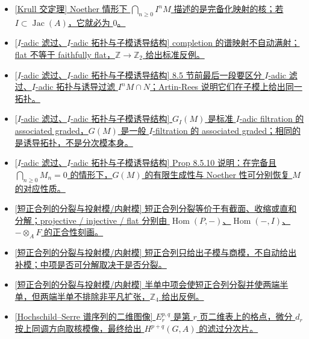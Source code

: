 \documentclass[a4paper]{ctexart}
\theoremstyle{definition}
\theoremstyle{analysis}
\theoremstyle{plain}
\begin{document}
\begin{itemize}
  \item \hyperref[rem:krull-intersection]{[\hyperref[subsec:krull-intersection]{Krull 交定理}] Noether 情形下 \(\bigcap_{n\ge 0} I^nM\) 描述的是完备化映射的核；若 \(I\subset \operatorname{Jac}(A)\)，它就必为 \(0\)。}
  \item \hyperref[rem:completion-spec-not-surjective]{[\hyperref[subsec:iadic-subspace-topology]{\(I\)-adic 滤过、\(I\)-adic 拓扑与子模诱导结构}] completion 的谱映射不自动满射；flat 不等于 faithfully flat，\(\mathbb Z\to \mathbb Z_2\) 给出标准反例。}
  \item \hyperref[rem:artin-rees-subspace-topology]{[\hyperref[subsec:iadic-subspace-topology]{\(I\)-adic 滤过、\(I\)-adic 拓扑与子模诱导结构}] 8.5 节前最后一段要区分 \(I\)-adic 滤过、\(I\)-adic 拓扑与诱导过滤 \(I^nM\cap N\)；Artin-Rees 说明它们在子模上给出同一拓扑。}
  \item \hyperref[rem:giM-vs-gM]{[\hyperref[subsec:iadic-subspace-topology]{\(I\)-adic 滤过、\(I\)-adic 拓扑与子模诱导结构}] \(G_I(M)\) 是标准 \(I\)-adic filtration 的 associated graded，\(G(M)\) 是一般 \(I\)-filtration 的 associated graded；相同的是诱导拓扑，不是分次模本身。}
  \item \hyperref[rem:prop8510-graded-recovery]{[\hyperref[subsec:iadic-subspace-topology]{\(I\)-adic 滤过、\(I\)-adic 拓扑与子模诱导结构}] Prop 8.5.10 说明：在完备且 \(\bigcap_{n\ge 0}M_n=0\) 的情形下，\(G(M)\) 的有限生成性与 Noether 性可分别恢复 \(M\) 的对应性质。}
  \item \hyperref[rem:split-projective-injective]{[\hyperref[subsec:split-projective-injective]{短正合列的分裂与投射模/内射模}] 短正合列分裂等价于有截面、收缩或直和分解；projective / injective / flat 分别由 \(\operatorname{Hom}(P,-)\)、\(\operatorname{Hom}(-,I)\)、\(-\otimes_A F\) 的正合性刻画。}
  \item \hyperref[rem:short-exact-nonsplit-reducible]{[\hyperref[subsec:split-projective-injective]{短正合列的分裂与投射模/内射模}] 短正合列只给出子模与商模，不自动给出补模；中项是否可分解取决于是否分裂。}
  \item \hyperref[rem:semisimple-short-exact-sequence]{[\hyperref[subsec:split-projective-injective]{短正合列的分裂与投射模/内射模}] 半单中项会使短正合列分裂并使两端半单，但两端半单不排除非平凡扩张，\(\mathbb Z_4\) 给出反例。}
  \item \hyperref[rem:hs-spectral-sequence-plane]{[\hyperref[subsec:hs-spectral-sequence-plane]{Hochschild--Serre 谱序列的二维图像}] \(E_r^{p,q}\) 是第 \(r\) 页二维表上的格点，微分 \(d_r\) 按上同调方向取核模像，最终给出 \(H^{p+q}(G,A)\) 的滤过分次片。}

\end{itemize}
\end{document}
